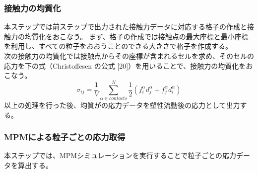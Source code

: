 \documentclass[12pt]{ltjsarticle}
\begin{document}
\subsubsection{接触力の均質化}
本ステップでは前ステップで出力された接触力データに対応する格子の作成と接触力の均質化をおこなう。
まず、格子の作成では接触点の最大座標と最小座標を利用し、すべての粒子をおおうことのできる大きさで格子を作成する。
\\
次の接触力の均質化では接触点からその座標が含まれるセルを求め、そのセルの応力を下の式（Christoffesen の公式 [20]）を用いることで、接触力の均質化をおこなう。
\begin{equation}
\sigma_{i j}=\frac{1}{V} \sum_{\alpha \in contacts}^N \frac{1}{2}\left(f_i^\alpha d_j^\alpha+f_j^\alpha d_i^\alpha\right)
\end{equation}
以上の処理を行った後、均質がの応力データを塑性流動後の応力として出力する。

\newpage

\subsubsection{MPMによる粒子ごとの応力取得}
本ステップでは、MPMシミュレーションを実行することで粒子ごとの応力データを算出する。
\end{document}
